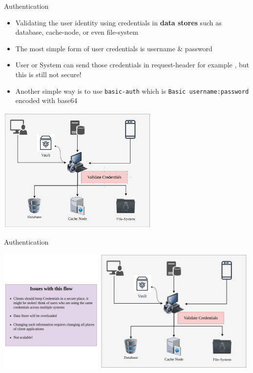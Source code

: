 \documentclass{beamer}
\newcommand{\code}[1]{\colorbox{codegray}{\texttt{#1}}}
\begin{document}
\begin{frame}[t]{Authentication}
  \begin{itemize}
  	\tiny
    \item<1-> Validating the user identity using credentials in \textbf{data stores} such as database, cache-node, or even file-system
    \item<2-> The most simple form of user credentials is username \& password 
    \item<3-> User or System can send those credentials in request-header for example , but this is still not secure!
    \item<4-> Another simple way is to use \code{basic-auth} which is \code{Basic username:password} encoded with base64
  \end{itemize}
  
  	\begin{center}
   		\includegraphics[width=0.6\textwidth, height=0.6\textheight]{img/auth-systems.png}
	\end{center}		
  
\end{frame}

\begin{frame}[t]{Authentication}

  	\begin{center}
   		\includegraphics[width=0.99\textwidth, height=0.6\textheight]{img/auth-systems-issues.png}
	\end{center}		
  
\end{frame}
\end{document}
